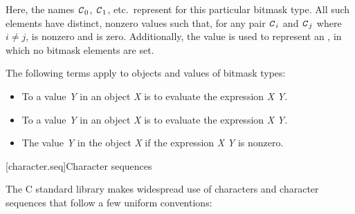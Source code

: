 \pnum
Here, the names $\texttt{\textit{C}}_0$,
$\texttt{\textit{C}}_1$, etc.\ represent
for this particular bitmask type.
%
All such elements have distinct, nonzero values such that, for any pair $\texttt{\textit{C}}_i$
and $\texttt{\textit{C}}_j$ where $i \neq j$,  is nonzero and
 is zero.
Additionally, the value  is used to represent an , in which no
bitmask elements are set.

\pnum
The following terms apply to objects and values of
bitmask types:
\begin{itemize}
\item
To 
a value \textit{Y} in an object \textit{X}
is to evaluate the expression \textit{X} \tcode{|=} \textit{Y}.
\item
To 
a value \textit{Y} in an object
\textit{X} is to evaluate the expression \textit{X} \tcode{\&= \~}\textit{Y}.
\item
The value \textit{Y}  in the object
\textit{X} if the expression \textit{X} \tcode{\&} \textit{Y} is nonzero.
\end{itemize}

[character.seq]{Character sequences}

\pnum
The C standard library makes widespread use
%
of characters and character sequences that follow a few uniform conventions:

